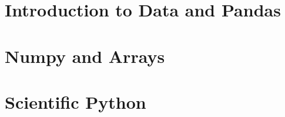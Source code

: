 \documentclass[12pt, twosides]{report}
\begin{document}
\chapter{Introduction to Data and Pandas}


\chapter{Numpy and Arrays}
\label{chap:numpy}


\chapter{Scientific Python}
\label{chap:sci}


% 

% 


% 

% 

% 
% 
\end{document}
